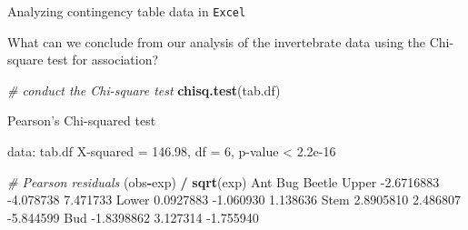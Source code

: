 \documentclass[
  ignorenonframetext,
  t]{beamer}
\newenvironment{Shaded}{\begin{snugshade}}{\end{snugshade}}
\newcommand{\CommentTok}[1]{\textcolor[rgb]{0.56,0.35,0.01}{\textit{#1}}}
\newcommand{\FloatTok}[1]{\textcolor[rgb]{0.00,0.00,0.81}{#1}}
\newcommand{\KeywordTok}[1]{\textcolor[rgb]{0.13,0.29,0.53}{\textbf{#1}}}
\newcommand{\NormalTok}[1]{#1}
\newcommand{\OperatorTok}[1]{\textcolor[rgb]{0.81,0.36,0.00}{\textbf{#1}}}
\newcommand{\StringTok}[1]{\textcolor[rgb]{0.31,0.60,0.02}{#1}}
\begin{document}
\begin{frame}[fragile]{Analyzing contingency table data in
\texttt{Excel}}
\protect\hypertarget{analyzing-contingency-table-data-in-8}{}

What can we conclude from our analysis of the invertebrate data using
the Chi-square test for association?\\
\scriptsize

\begin{Shaded}
\begin{Highlighting}[]
\CommentTok{# conduct the Chi-square test}
\KeywordTok{chisq.test}\NormalTok{(tab.df)}

\NormalTok{    Pearson}\StringTok{'s Chi-squared test}

\StringTok{data:  tab.df}
\StringTok{X-squared = 146.98, df = 6, p-value < 2.2e-16}
\end{Highlighting}
\end{Shaded}

\begin{Shaded}
\begin{Highlighting}[]
\CommentTok{# Pearson residuals}
\NormalTok{(obs}\OperatorTok{-}\NormalTok{exp) }\OperatorTok{/}\StringTok{ }\KeywordTok{sqrt}\NormalTok{(exp)}
\NormalTok{             Ant       Bug    Beetle}
\NormalTok{Upper }\FloatTok{-2.6716883} \FloatTok{-4.078738}  \FloatTok{7.471733}
\NormalTok{Lower  }\FloatTok{0.0927883} \FloatTok{-1.060930}  \FloatTok{1.138636}
\NormalTok{Stem   }\FloatTok{2.8905810}  \FloatTok{2.486807} \FloatTok{-5.844599}
\NormalTok{Bud   }\FloatTok{-1.8398862}  \FloatTok{3.127314} \FloatTok{-1.755940}
\end{Highlighting}
\end{Shaded}

\end{frame}
\end{document}

